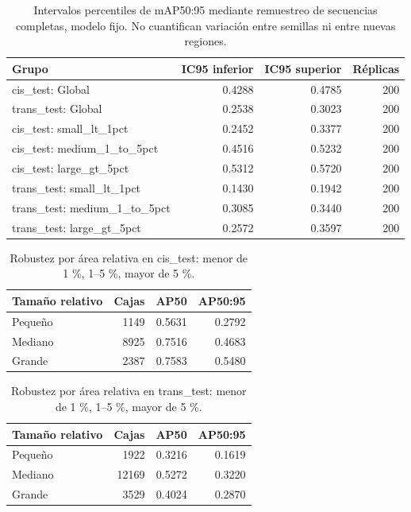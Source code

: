 \begin{table}[H]
\centering\small
\caption{Intervalos percentiles de mAP50:95 mediante remuestreo de secuencias completas, modelo fijo. No cuantifican variación entre semillas ni entre nuevas regiones.}
\begin{tabular}{lrrr}
\toprule
Grupo & IC95 inferior & IC95 superior & Réplicas \\
\midrule
cis\_test: Global & 0.4288 & 0.4785 & 200 \\
trans\_test: Global & 0.2538 & 0.3023 & 200 \\
cis\_test: small\_lt\_1pct & 0.2452 & 0.3377 & 200 \\
cis\_test: medium\_1\_to\_5pct & 0.4516 & 0.5232 & 200 \\
cis\_test: large\_gt\_5pct & 0.5312 & 0.5720 & 200 \\
trans\_test: small\_lt\_1pct & 0.1430 & 0.1942 & 200 \\
trans\_test: medium\_1\_to\_5pct & 0.3085 & 0.3440 & 200 \\
trans\_test: large\_gt\_5pct & 0.2572 & 0.3597 & 200 \\
\bottomrule
\end{tabular}
\end{table}

\begin{table}[H]
\centering\small
\caption{Robustez por área relativa en cis\_test: menor de 1 \%, 1--5 \%, mayor de 5 \%.}
\begin{tabular}{lrrr}
\toprule
Tamaño relativo & Cajas & AP50 & AP50:95 \\
\midrule
Pequeño & 1149 & 0.5631 & 0.2792 \\
Mediano & 8925 & 0.7516 & 0.4683 \\
Grande & 2387 & 0.7583 & 0.5480 \\
\bottomrule
\end{tabular}
\end{table}

\begin{table}[H]
\centering\small
\caption{Robustez por área relativa en trans\_test: menor de 1 \%, 1--5 \%, mayor de 5 \%.}
\begin{tabular}{lrrr}
\toprule
Tamaño relativo & Cajas & AP50 & AP50:95 \\
\midrule
Pequeño & 1922 & 0.3216 & 0.1619 \\
Mediano & 12169 & 0.5272 & 0.3220 \\
Grande & 3529 & 0.4024 & 0.2870 \\
\bottomrule
\end{tabular}
\end{table}
